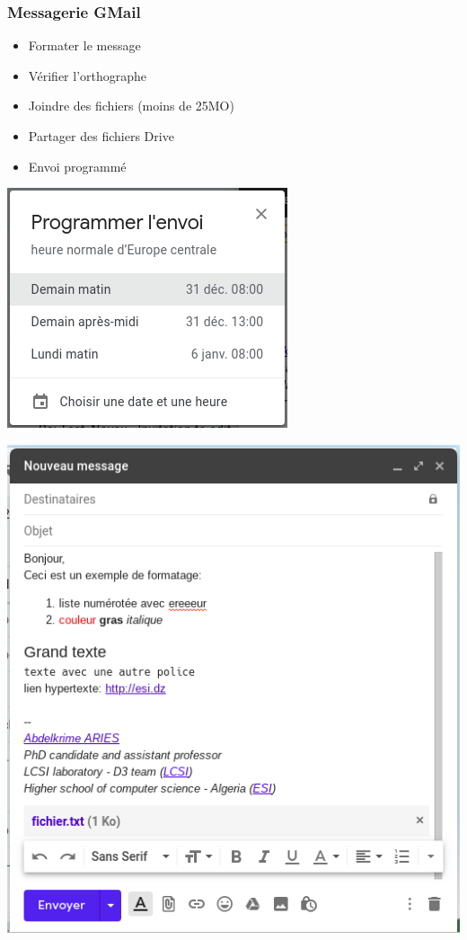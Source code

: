 \documentclass[xcolor=table]{beamer}
\begin{document}
\begin{frame}
\frametitle{Messagerie GMail}

\begin{minipage}{0.48\textwidth}
	\begin{itemize}
		\item Formater le message
		\item Vérifier l'orthographe
		\item Joindre des fichiers (moins de 25MO)
		\item Partager des fichiers Drive
		\item Envoi programmé
	\end{itemize}
	\includegraphics[width=.6\textwidth]{..//img/Bweb02-ri-gmail/gmail-sendlater.png}
\end{minipage}
\begin{minipage}{0.48\textwidth}
	\includegraphics[width=\textwidth]{..//img/Bweb02-ri-gmail/gmail-new.png}
\end{minipage}


\end{frame}
\end{document}
